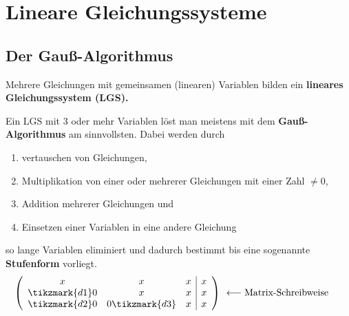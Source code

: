 \documentclass{article}
\begin{document}
\section{Lineare Gleichungssysteme}
\subsection{Der Gauß-Algorithmus}
Mehrere Gleichungen mit gemeinsamen (linearen) Variablen bilden ein
\textbf{lineares Gleichungssystem (LGS).}

Ein LGS mit 3 oder mehr Variablen löst man meistens mit dem 
\textbf{Gauß-Algorithmus} am sinnvollsten. Dabei werden durch
\begin{enumerate}
    \item vertauschen von Gleichungen,
    \item Multiplikation von einer oder mehrerer Gleichungen mit einer Zahl $\not= 0$,
    \item Addition mehrerer Gleichungen und
    \item Einsetzen einer Variablen in eine andere Gleichung
\end{enumerate}
so lange Variablen eliminiert und dadurch bestimmt bis eine sogenannte
\textbf{Stufenform} vorliegt.
\[\left( \begin{array}{ccc|c} x & x & x & x \\ \tikzmark{d1}0 & x & x  & x \\ \tikzmark{d2}0 & 0\tikzmark{d3} & x & x \end{array} \right) \begin{array}{cc}
    &\\
    \longleftarrow \text{Matrix-Schreibweise} &\\
    &
\end{array}\]
\end{document}
